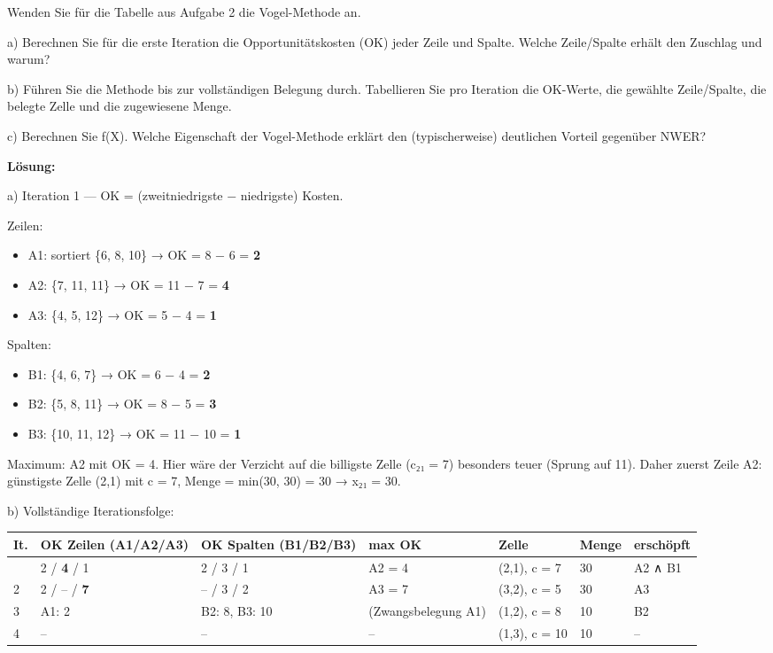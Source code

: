 \documentclass[11pt, a4paper]{article}
\begin{document}
Wenden Sie für die Tabelle aus Aufgabe 2 die Vogel-Methode an.


a) Berechnen Sie für die erste Iteration die Opportunitätskosten (OK) jeder Zeile und Spalte. Welche Zeile/Spalte erhält den Zuschlag und warum?

b) Führen Sie die Methode bis zur vollständigen Belegung durch. Tabellieren Sie pro Iteration die OK-Werte, die gewählte Zeile/Spalte, die belegte Zelle und die zugewiesene Menge.

c) Berechnen Sie f(X). Welche Eigenschaft der Vogel-Methode erklärt den (typischerweise) deutlichen Vorteil gegenüber NWER?


\textbf{Lösung:}


a) Iteration 1 — OK = (zweitniedrigste − niedrigste) Kosten.


Zeilen:

\begin{itemize}
  \item A1: sortiert \{6, 8, 10\} → OK = 8 − 6 = \textbf{2}
  \item A2: \{7, 11, 11\} → OK = 11 − 7 = \textbf{4}
  \item A3: \{4, 5, 12\} → OK = 5 − 4 = \textbf{1}
\end{itemize}

Spalten:

\begin{itemize}
  \item B1: \{4, 6, 7\} → OK = 6 − 4 = \textbf{2}
  \item B2: \{5, 8, 11\} → OK = 8 − 5 = \textbf{3}
  \item B3: \{10, 11, 12\} → OK = 11 − 10 = \textbf{1}
\end{itemize}

Maximum: A2 mit OK = 4. Hier wäre der Verzicht auf die billigste Zelle (c₂₁ = 7) besonders teuer (Sprung auf 11). Daher zuerst Zeile A2: günstigste Zelle (2,1) mit c = 7, Menge = min(30, 30) = 30 → x₂₁ = 30.


b) Vollständige Iterationsfolge:



{\footnotesize
\begin{tabularx}{\linewidth}{XXXXXXX}
\hline
\rowcolor{tableheadbg}
{\color{white}\textbf{It.}} & {\color{white}\textbf{OK Zeilen (A1/A2/A3)}} & {\color{white}\textbf{OK Spalten (B1/B2/B3)}} & {\color{white}\textbf{max OK}} & {\color{white}\textbf{Zelle}} & {\color{white}\textbf{Menge}} & {\color{white}\textbf{erschöpft}} \\[2pt]
\hline
\endhead
\hline
\endfoot
1 & 2 / \textbf{4} / 1 & 2 / 3 / 1 & A2 = 4 & (2,1), c = 7 & 30 & A2 ∧ B1 \\
2 & 2 / – / \textbf{7} & – / 3 / 2 & A3 = 7 & (3,2), c = 5 & 30 & A3 \\
3 & A1: 2 & B2: 8, B3: 10 & (Zwangsbelegung A1) & (1,2), c = 8 & 10 & B2 \\
4 & – & – & – & (1,3), c = 10 & 10 & – \\
\end{tabularx}
}
\end{document}
